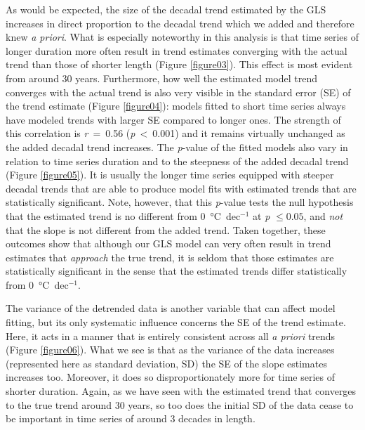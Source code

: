 \documentclass[]{ametsoc}
\begin{document}
As would be expected, the size of the decadal trend estimated by the GLS increases in direct proportion to the decadal trend which we added and therefore knew \emph{a priori}. What is especially noteworthy in this analysis is that time series of longer duration more often result in trend estimates converging with the actual trend than those of shorter length (Figure \ref{figure03}). This effect is most evident from around 30 years. Furthermore, how well the estimated model trend converges with the actual trend is also very visible in the standard error (SE) of the trend estimate (Figure \ref{figure04}): models fitted to short time series always have modeled trends with larger SE compared to longer ones. The strength of this correlation is \emph{r}~=~0.56 (\emph{p}~\textless~0.001) and it remains virtually unchanged as the added decadal trend increases. The \emph{p}-value of the fitted models also vary in relation to time series duration and to the steepness of the added decadal trend (Figure \ref{figure05}). It is usually the longer time series equipped with steeper decadal trends that are able to produce model fits with estimated trends that are statistically significant. Note, however, that this \emph{p}-value tests the null hypothesis that the estimated trend is no different from \SI{0}{\degreeCelsius}~dec$^{-1}$ at \emph{p} $\leq 0.05$, and \emph{not} that the slope is not different from the added trend. Taken together, these outcomes show that although our GLS model can very often result in trend estimates that \emph{approach} the true trend, it is seldom that those estimates are statistically significant in the sense that the estimated trends differ statistically from \SI{0}{\degreeCelsius}~dec$^{-1}$.

The variance of the detrended data is another variable that can affect model fitting, but its only systematic influence concerns the SE of the trend estimate. Here, it acts in a manner that is entirely consistent across all \emph{a priori} trends (Figure \ref{figure06}). What we see is that as the variance of the data increases (represented here as standard deviation, SD) the SE of the slope estimates increases too. Moreover, it does so disproportionately more for time series of shorter duration. Again, as we have seen with the estimated trend that converges to the true trend around 30 years, so too does the initial SD of the data cease to be important in time series of around 3 decades in length.
\end{document}
